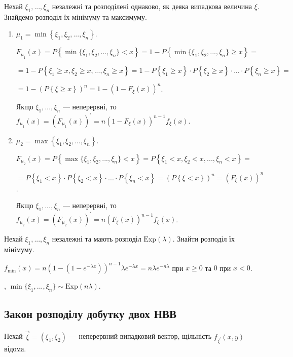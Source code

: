Нехай $\xi_1, ..., \xi_n$ незалежні та розподілені однаково, як деяка випадкова величина $\xi$.
Знайдемо розподіл їх мінімуму та максимуму.
\begin{enumerate}
    \item $\mu_1 = \min\left\{\xi_1, \xi_2, ..., \xi_n\right\}$.

    $F_{\mu_1} (x) = P \left\{ \min\{\xi_1, \xi_2, ..., \xi_n\} < x \right\} =
    1 - P \left\{ \min\{\xi_1, \xi_2, ..., \xi_n\} \geq x \right\} =$

    $ = 1 - P \left\{ \xi_1 \geq x, \xi_2 \geq x, ..., \xi_n \geq x \right\} = 
    1 - P\left\{ \xi_1 \geq x\right\} \cdot P\left\{ \xi_2 \geq x\right\} \cdot ... \cdot P\left\{ \xi_n \geq x\right\} = $
    
    $ = 1 - (P\left\{ \xi \geq x\right\})^n = 1 - (1- F_\xi (x))^n$.

    Якщо $\xi_1, ..., \xi_n$ --- неперервні, то $f_{\mu_1} (x) = \left( F_{\mu_1} (x)\right)^\prime = n (1- F_\xi (x))^{n-1} f_\xi(x)$.
    \item $\mu_2 = \max\left\{\xi_1, \xi_2, ..., \xi_n\right\}$.

    $F_{\mu_2} (x) = P \left\{ \max\{\xi_1, \xi_2, ..., \xi_n\} < x \right\} =
    P \left\{ \xi_1 < x, \xi_2 < x, ..., \xi_n < x \right\} = $

    $ = P\left\{ \xi_1 < x\right\} \cdot P\left\{ \xi_2 < x\right\} \cdot ... \cdot P\left\{ \xi_n < x\right\} =
    (P\left\{ \xi < x\right\})^n = (F_\xi (x))^n$.

    Якщо $\xi_1, ..., \xi_n$ --- неперервні, то $f_{\mu_2} (x) = \left( F_{\mu_2} (x)\right)^\prime = n (F_\xi (x))^{n-1} f_\xi(x)$.
\end{enumerate}

\begin{example}
    Нехай $\xi_1, ..., \xi_n$ незалежні та мають розподіл $\mathrm{Exp}(\lambda)$. Знайти розподіл їх мінімуму.

    \noindent$f_{\min}(x) = n (1-(1-e^{-\lambda x}))^{n-1} \lambda e^{-\lambda x} = n \lambda e^{-n\lambda}$ при $x \geq 0$ та $0$ при $x < 0$.
    
    , $\min\{\xi_1, ..., \xi_n\} \sim \mathrm{Exp} (n \lambda)$.
\end{example}

\subsection{Закон розподілу добутку двох НВВ}
Нехай $\vec{\xi} = (\xi_1, \xi_2)$ --- неперервний випадковий вектор, щільність
$f_{\vec{\xi}}(x, y)$ відома.

